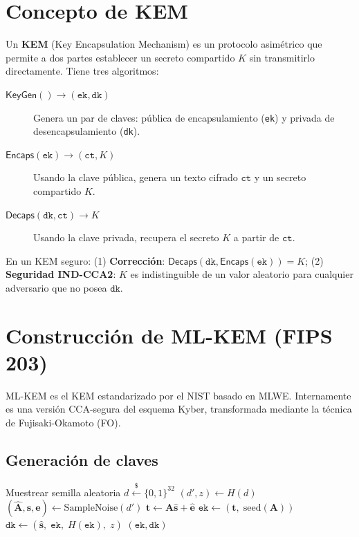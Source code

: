 \documentclass[12pt,a4paper,twoside,openright]{book}
\theoremstyle{plain}
\theoremstyle{definition}
\theoremstyle{remark}
\newcommand{\vv}[1]{\mathbf{#1}}
\newcommand{\mm}[1]{\mathbf{#1}}
\newcommand{\MLKEM}{\textsf{ML-KEM}}
\newcommand{\KeyGen}{\mathsf{KeyGen}}
\newcommand{\Encaps}{\mathsf{Encaps}}
\newcommand{\Decaps}{\mathsf{Decaps}}
\begin{document}
\section{Concepto de KEM}

Un \textbf{KEM} (Key Encapsulation Mechanism) es un protocolo asim\'etrico
que permite a dos partes establecer un secreto compartido $K$ sin
transmitirlo directamente. Tiene tres algoritmos:

\begin{description}
  \item[$\KeyGen() \to (\mathtt{ek}, \mathtt{dk})$] Genera un par de claves:
    p\'ublica de encapsulamiento (\texttt{ek}) y privada de
    desencapsulamiento (\texttt{dk}).
  \item[$\Encaps(\mathtt{ek}) \to (\mathtt{ct}, K)$] Usando la clave p\'ublica,
    genera un texto cifrado $\mathtt{ct}$ y un secreto compartido $K$.
  \item[$\Decaps(\mathtt{dk}, \mathtt{ct}) \to K$] Usando la clave privada,
    recupera el secreto $K$ a partir de $\mathtt{ct}$.
\end{description}

\begin{minota}
  En un KEM seguro: (1) \textbf{Correcci\'on}: $\Decaps(\mathtt{dk},
  \Encaps(\mathtt{ek})) = K$; (2) \textbf{Seguridad IND-CCA2}: $K$ es
  indistinguible de un valor aleatorio para cualquier adversario que no
  posea $\mathtt{dk}$.
\end{minota}

\section{Construcci\'on de ML-KEM (FIPS 203)}

ML-KEM es el KEM estandarizado por el NIST basado en MLWE. Internamente es
una versi\'on CCA-segura del esquema Kyber, transformada mediante la t\'ecnica
de Fujisaki-Okamoto (FO).

\subsection{Generaci\'on de claves}

\begin{algorithm}[H]
\caption{$\MLKEM.\KeyGen()$}
\label{alg:mlkem_keygen}
Muestrear semilla aleatoria $d \xleftarrow{\$} \{0,1\}^{32}$\;
$(d', z) \leftarrow H(d)$
$(\hat{\mm{A}}, \vv{s}, \vv{e}) \leftarrow \mathrm{SampleNoise}(d')$\;
$\vv{t} \leftarrow \hat{\mm{A}}\hat{\vv{s}} + \hat{\vv{e}}$
$\mathtt{ek} \leftarrow (\vv{t},\; \mathrm{seed}(\mm{A}))$
$\mathtt{dk} \leftarrow (\hat{\vv{s}},\; \mathtt{ek},\; H(\mathtt{ek}),\; z)$
\Return $(\mathtt{ek}, \mathtt{dk})$
\end{algorithm}
\end{document}
